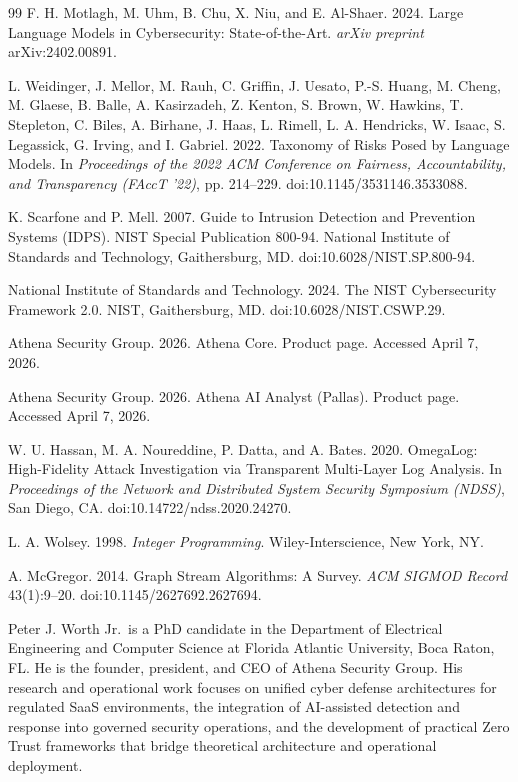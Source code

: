 \documentclass[unnumsec,webpdf,contemporary,large]{oup-authoring-template}
\theoremstyle{thmstyleone}
\theoremstyle{thmstyletwo}
\theoremstyle{thmstylethree}
\begin{document}
\begin{thebibliography}{99}
F. H. Motlagh, M. Uhm, B. Chu, X. Niu, and E. Al-Shaer. 2024. Large Language
Models in Cybersecurity: State-of-the-Art. \textit{arXiv preprint}
arXiv:2402.00891.

L. Weidinger, J. Mellor, M. Rauh, C. Griffin, J. Uesato, P.-S. Huang,
M. Cheng, M. Glaese, B. Balle, A. Kasirzadeh, Z. Kenton, S. Brown, W. Hawkins,
T. Stepleton, C. Biles, A. Birhane, J. Haas, L. Rimell, L. A. Hendricks,
W. Isaac, S. Legassick, G. Irving, and I. Gabriel. 2022.
Taxonomy of Risks Posed by Language Models.
In \textit{Proceedings of the 2022 ACM Conference on Fairness, Accountability,
and Transparency (FAccT '22)}, pp. 214--229. doi:10.1145/3531146.3533088.

K. Scarfone and P. Mell. 2007. Guide to Intrusion Detection and Prevention Systems
(IDPS). NIST Special Publication 800-94. National Institute of Standards and
Technology, Gaithersburg, MD. doi:10.6028/NIST.SP.800-94.

National Institute of Standards and Technology. 2024. The NIST Cybersecurity Framework
2.0. NIST, Gaithersburg, MD. doi:10.6028/NIST.CSWP.29.

Athena Security Group. 2026. Athena Core. Product page. Accessed April 7, 2026.

Athena Security Group. 2026. Athena AI Analyst (Pallas). Product page. Accessed
April 7, 2026.

W. U. Hassan, M. A. Noureddine, P. Datta, and A. Bates. 2020.
OmegaLog: High-Fidelity Attack Investigation via Transparent Multi-Layer
Log Analysis. In \textit{Proceedings of the Network and Distributed System
Security Symposium (NDSS)}, San Diego, CA. doi:10.14722/ndss.2020.24270.

L. A. Wolsey. 1998. \textit{Integer Programming}. Wiley-Interscience, New York, NY.

A. McGregor. 2014. Graph Stream Algorithms: A Survey.
\textit{ACM SIGMOD Record} 43(1):9--20. doi:10.1145/2627692.2627694.

\end{thebibliography}


\begin{biography}{}{\author{Peter J. Worth Jr.} Peter J. Worth Jr.\ is a PhD candidate in the Department of Electrical Engineering and
Computer Science at Florida Atlantic University, Boca Raton, FL. He is the founder,
president, and CEO of Athena Security Group. His research and operational work focuses on
unified cyber defense architectures for regulated SaaS environments, the integration of
AI-assisted detection and response into governed security operations, and the development
of practical Zero Trust frameworks that bridge theoretical architecture and operational
deployment.}
\end{biography}
\end{document}
